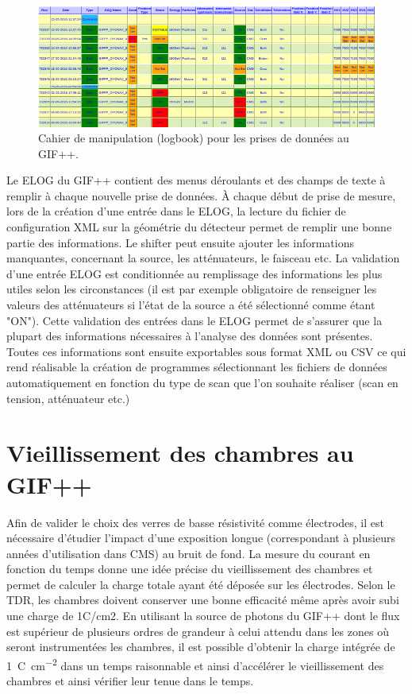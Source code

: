 \begin{figure}[!ht]
	\centering
	\includegraphics[width=0.75\linewidth]{GLA/ELOG2.png}
	\caption{Cahier de manipulation (logbook) pour les prises de données au GIF++.}
	\label{ELOG}
\end{figure}

Le ELOG du GIF++ contient des menus déroulants et des champs de texte à remplir à chaque nouvelle prise de données. À chaque début de prise de mesure, lors de la création d'une entrée dans le ELOG, la lecture du fichier de configuration XML sur la géométrie du détecteur permet de remplir une bonne partie des informations. Le shifter peut ensuite ajouter les informations manquantes, concernant la source, les atténuateurs, le faisceau etc. La validation d'une entrée ELOG est conditionnée au remplissage des informations les plus utiles selon les circonstances (il est par exemple obligatoire de renseigner les valeurs des atténuateurs si l'état de la source a été sélectionné comme étant "ON"). Cette validation des entrées dans le ELOG permet de s'assurer que la plupart des informations nécessaires à l'analyse des données sont présentes. Toutes ces informations sont ensuite exportables sous format XML ou CSV ce qui rend réalisable la création de programmes sélectionnant les fichiers de données automatiquement en fonction du type de scan que l'on souhaite réaliser (scan en tension, atténuateur etc.)
\vspace*{-0.2cm}
\section{Vieillissement des chambres au GIF++}
\vspace*{-0.4cm}
Afin de valider le choix des verres de basse résistivité comme électrodes, il est nécessaire d'étudier l'impact d'une exposition longue (correspondant à plusieurs années d'utilisation dans CMS) au bruit de fond. La mesure du courant en fonction du temps donne une idée précise du vieillissement des chambres et permet de calculer la charge totale ayant été déposée sur les électrodes. Selon le TDR, les chambres doivent conserver une bonne efficacité même après avoir subi une charge de 1C/cm2. En utilisant la source de photons du GIF++ dont le flux est supérieur de plusieurs ordres de grandeur à celui attendu dans les zones où seront instrumentées les chambres, il est possible d'obtenir la charge intégrée de \SI{1}{\coulomb\per\square\centi\meter} dans un temps raisonnable et ainsi d'accélérer le vieillissement des chambres et ainsi vérifier leur tenue dans le temps.


